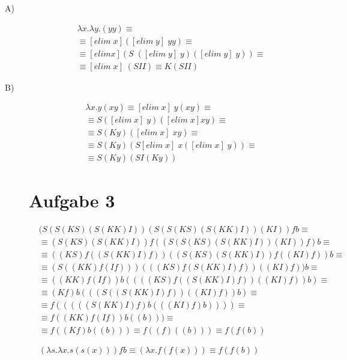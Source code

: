 \documentclass[11]{article}
\begin{document}
\begin{description}
\item[A)]
\begin{align*}
& \lambda x. \lambda y. (yy) \equiv \\
& \equiv [elim \; x] ([elim \; y] \; yy) \equiv \\
& \equiv [elim x] (S \; ([elim \; y] \; y)([elim \; y] \; y)) \equiv \\
& \equiv [elim \; x] \; (SII) \equiv K (SII)
\end{align*}

\item[B)]
\begin{align*}
& \lambda x.y(xy) \equiv [elim \; x] \; y(xy) \equiv \\
& \equiv S ([elim \; x] \; y)([elim \; x] xy) \equiv \\
& \equiv S (Ky)([elim \; x] \; xy) \equiv \\
& \equiv S (Ky) (S [elim \; x] \; x ([elim \; x] \; y)) \equiv \\
& \equiv S (Ky)(SI(Ky))
\end{align*}
\section*{Aufgabe 3}
\begin{align*}
& (S (S (KS)(S (KK)I))(S (S (KS)(S (KK)I))(KI))fb  \equiv \tag*{S Anwenden $\Rightarrow$} \\
& \equiv (S (KS)(S (KK)I))f((S (S (KS)(S (KK)I))(KI))f)b \equiv \tag*{2xS Anwenden $		
	\Rightarrow$} \\
& \equiv ((KS) f ((S(KK)I)f))((S(KS)(S(KK)I))f((KI)f))b \equiv \tag*{K, S Anwenden $\Rightarrow$} \\
& \equiv (S((KK)f(If)))(((KS)f(S(KK)I)f))((KI)f))b \equiv \tag*{S Anwenden $\Rightarrow$} \\
& \equiv ((KK)f(If))b((((KS)f((S(KK)I)f))((KI)f))b) \equiv \tag*{K, I, K Anwenden $\Rightarrow$} \\
& \equiv (K f)b(((S((S(KK)I)f))((KI)f))b) \equiv \tag*{S Anwenden $\Rightarrow$} \\
& \equiv f(((((S(KK)I)f)b(((KI)f)b)))) \equiv \tag*{S,K Anwenden, I Anwenden $\Rightarrow$} \\
& \equiv f((KK)f(If))b((b))) \equiv \tag*{K, I Anwenden} \\
& \equiv f((Kf)b((b))) \equiv f((f)((b))) \equiv f(f(b)) \\ \\ \\
& (\lambda s.\lambda x. s(s(x)))fb \equiv (\lambda x.f(f(x))) \equiv f(f(b))
\end{align*}

\end{description}
\end{document}
